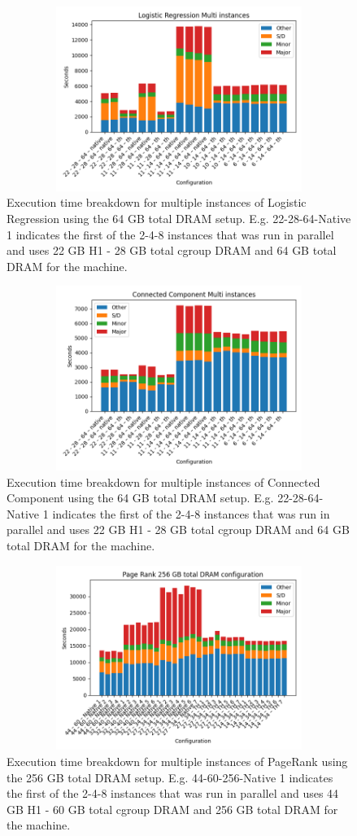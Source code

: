 \documentclass[twocolumn,10pt]{asme2e}
\begin{document}
\begin{figure}[ht]
        \includegraphics[width=13cm,height=6cm]{logr64.png}
	\caption{Execution time breakdown for multiple instances of Logistic Regression using the 64 GB total DRAM setup. 
	E.g. 22-28-64-Native 1 indicates the first of the 2-4-8 instances that was run in parallel and uses 22 GB H1 - 28 GB total cgroup DRAM and 64 GB total DRAM for the machine.}
	\label{fig:logr64}
\end{figure}

\begin{figure}[ht]
        \includegraphics[width=13cm,height=6cm]{cc64.png}
	\caption{Execution time breakdown for multiple instances of Connected Component using the 64 GB total DRAM setup. 
	E.g. 22-28-64-Native 1 indicates the first of the 2-4-8 instances that was run in parallel and uses 22 GB H1 - 28 GB total cgroup DRAM and 64 GB total DRAM for the machine.}
	\label{fig:cc64}
\end{figure}

\begin{figure}[ht]
        \includegraphics[width=13cm,height=6cm]{pr256.png}
	\caption{Execution time breakdown for multiple instances of PageRank using the 256 GB total DRAM setup. 
	E.g. 44-60-256-Native 1 indicates the first of the 2-4-8 instances that was run in parallel and uses 44 GB H1 - 60 GB total cgroup DRAM and 256 GB total DRAM for the machine.}
	\label{fig:pr256}
\end{figure}
\end{document}
